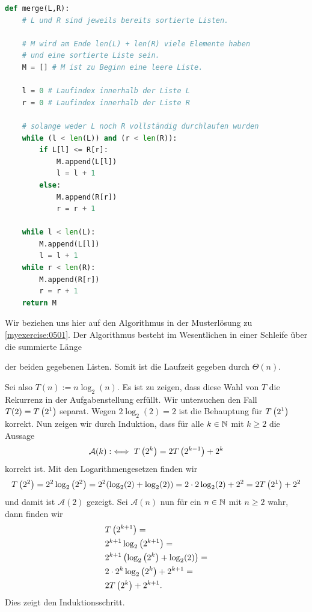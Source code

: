 \begin{myanswer}[myexercise:0501]
	\begin{lstlisting}[language=Python,caption=Implementation der Funktion \pythoninline{merge},label=listing:merge]
def merge(L,R):
    # L und R sind jeweils bereits sortierte Listen.

    # M wird am Ende len(L) + len(R) viele Elemente haben
    # und eine sortierte Liste sein.
    M = [] # M ist zu Beginn eine leere Liste.

    l = 0 # Laufindex innerhalb der Liste L
    r = 0 # Laufindex innerhalb der Liste R

    # solange weder L noch R vollständig durchlaufen wurden
    while (l < len(L)) and (r < len(R)):
        if L[l] <= R[r]:
            M.append(L[l])
            l = l + 1
        else:
            M.append(R[r])
            r = r + 1

    while l < len(L):
        M.append(L[l])
        l = l + 1
    while r < len(R):
        M.append(R[r])
        r = r + 1
    return M
\end{lstlisting}
\end{myanswer}

\begin{myanswer}[myexercise:0502]
	Wir beziehen uns hier auf den Algorithmus in der Musterlösung zu \cref{myexercise:0501}. Der Algorithmus besteht im Wesentlichen in einer Schleife über die summierte Länge
	\begin{center}
	\end{center}
	der beiden gegebenen Listen. Somit ist die Laufzeit gegeben durch $\Theta(n)$.
\end{myanswer}


\begin{myanswer}[myexercise:0503]
	Sei also $T(n) := n\log_2(n)$. Es ist zu zeigen, dass diese Wahl von $T$ die Rekurrenz in der Aufgabenstellung erfüllt. Wir untersuchen den Fall $T(2) = T\left(2^1\right)$ separat.
	Wegen $2\log_2(2) = 2$ ist die Behauptung für $T\left(2^1\right)$ korrekt. Nun zeigen wir durch Induktion, dass für alle $k\in\mathbb{N}$ mit $k\geq 2$ die Aussage
	\begin{align*}
		\mathcal{A}(k) :\iff T\left(2^k\right) = 2T\left(2^{k-1}\right) + 2^k
	\end{align*}
	korrekt ist. Mit den Logarithmengesetzen finden wir
	\begin{align*}
		T\left(2^2\right) = 2^2\log_2\left(2^2\right) = 2^2(\log_2(2) + \log_2(2)) = 2\cdot 2\log_2(2) + 2^2 = 2T\left(2^1\right) + 2^2
	\end{align*}
	und damit ist $\mathcal{A}(2)$ gezeigt. Sei $\mathcal{A}(n)$ nun für ein $n\in\mathbb{N}$ mit $n\geq 2$ wahr, dann finden wir
	\begin{align*}
		 & T\left(2^{k+1}\right) =                            \\
		 & 2^{k+1}\log_2\left(2^{k+1}\right) =                \\
		 & 2^{k+1}\left(\log_2\left(2^{k}\right) + \log_2(2)\right) = \\
		 & 2\cdot 2^{k}\log_2\left(2^{k}\right) + 2^{k+1} =   \\
		 & 2T\left(2^{k}\right) + 2^{k+1}.
	\end{align*}
	Dies zeigt den Induktionsschritt.
\end{myanswer}


\clearpage
\shipoutAnswer
